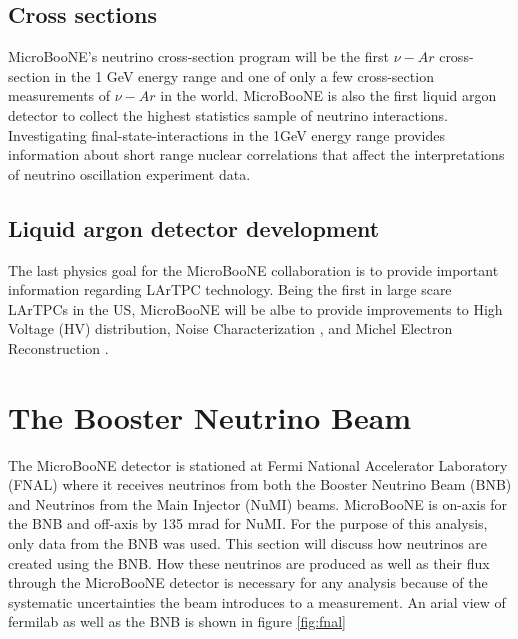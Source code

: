 \subsection{Cross sections}
MicroBooNE's neutrino cross-section program will be the first $\nu-Ar$ cross-section in the 1 GeV energy range and one of only a few cross-section measurements of $\nu-Ar$ in the world. MicroBooNE is also the first liquid argon detector to collect the highest statistics sample of neutrino interactions. Investigating final-state-interactions in the 1GeV energy range provides information about short range nuclear correlations that affect the interpretations of neutrino oscillation experiment data. 
\subsection{Liquid argon detector development}
The last physics goal for the MicroBooNE collaboration is to provide important information regarding LArTPC technology. Being the first in large scare LArTPCs in the US, MicroBooNE will be albe to provide improvements to High Voltage (HV) distribution, Noise Characterization \cite{noise}, and Michel Electron Reconstruction \cite{michel}. 

\section{The Booster Neutrino Beam}
The MicroBooNE detector is stationed at Fermi National Accelerator Laboratory (FNAL) where it receives neutrinos from both the Booster Neutrino Beam (BNB) and Neutrinos from the Main Injector (NuMI) beams. MicroBooNE is on-axis for the BNB and off-axis by 135 mrad for NuMI. For the purpose of this analysis, only data from the BNB was used. This section will discuss how neutrinos are created using the BNB. How these neutrinos are produced as well as their flux through the MicroBooNE detector is necessary for any analysis because of the systematic uncertainties the beam introduces to a measurement. An arial view of fermilab as well as the BNB is shown in figure \ref{fig:fnal}

